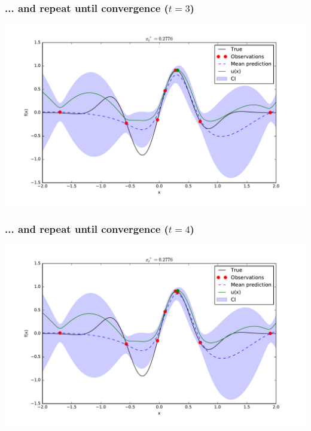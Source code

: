 \documentclass{beamer}
\begin{document}
\begin{frame}
    \frametitle{... and repeat until convergence ($t=3$)}
    \begin{center}
        \includegraphics[width=\textwidth]{code/fig4-3.pdf}
    \end{center}
\end{frame}

\begin{frame}
    \frametitle{... and repeat until convergence ($t=4$)}
    \begin{center}
        \includegraphics[width=\textwidth]{code/fig4-4.pdf}
    \end{center}
\end{frame}
\end{document}
